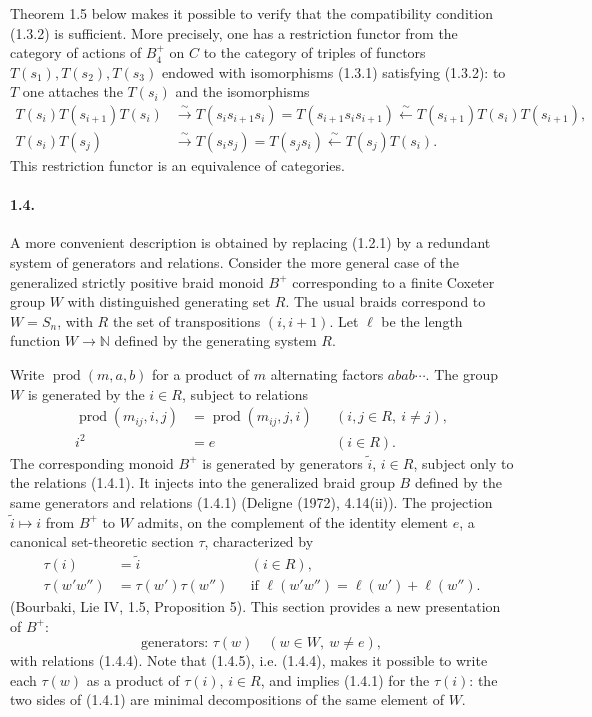 \documentclass[11pt]{article}
\newcommand{\prodword}{\operatorname{prod}}
\newcommand{\N}{\mathbb N}
\begin{document}
Theorem 1.5 below makes it possible to verify that the compatibility condition (1.3.2) is sufficient. More precisely, one has a restriction functor from the category of actions of $B_4^+$ on $C$ to the category of triples of functors $T(s_1),T(s_2),T(s_3)$ endowed with isomorphisms (1.3.1) satisfying (1.3.2): to $T$ one attaches the $T(s_i)$ and the isomorphisms
\[
\begin{aligned}
 T(s_i)T(s_{i+1})T(s_i)&\xrightarrow{\sim}T(s_i s_{i+1}s_i)=T(s_{i+1}s_i s_{i+1})\xleftarrow{\sim}T(s_{i+1})T(s_i)T(s_{i+1}),\\
 T(s_i)T(s_j)&\xrightarrow{\sim}T(s_i s_j)=T(s_js_i)\xleftarrow{\sim}T(s_j)T(s_i).
\end{aligned}
\]
This restriction functor is an equivalence of categories.

\paragraph{1.4.} A more convenient description is obtained by replacing (1.2.1) by a redundant system of generators and relations. Consider the more general case of the generalized strictly positive braid monoid $B^+$ corresponding to a finite Coxeter group $W$ with distinguished generating set $R$. The usual braids correspond to $W=S_n$, with $R$ the set of transpositions $(i,i+1)$. Let $\ell$ be the length function $W\to\N$ defined by the generating system $R$.

Write $\prodword(m,a,b)$ for a product of $m$ alternating factors $abab\cdots$. The group $W$ is generated by the $i\in R$, subject to relations
\begin{align}
 \prodword(m_{ij},i,j)&=\prodword(m_{ij},j,i) &&(i,j\in R,\ i\ne j),\tag{1.4.1}\\
 i^2&=e &&(i\in R).\tag{1.4.2}
\end{align}
The corresponding monoid $B^+$ is generated by generators $\widetilde{i}$, $i\in R$, subject only to the relations (1.4.1). It injects into the generalized braid group $B$ defined by the same generators and relations (1.4.1) (Deligne (1972), 4.14(ii)). The projection $\widetilde{i}\mapsto i$ from $B^+$ to $W$ admits, on the complement of the identity element $e$, a canonical set-theoretic section $\tau$, characterized by
\begin{align}
 \tau(i)&=\widetilde{i} &&(i\in R),\tag{1.4.3}\\
 \tau(w'w'')&=\tau(w')\tau(w'') &&\text{if }\ell(w'w'')=\ell(w')+\ell(w'').\tag{1.4.4}
\end{align}
(Bourbaki, Lie IV, 1.5, Proposition 5). This section provides a new presentation of $B^+$:
\begin{equation}
\text{generators: }\tau(w)\quad(w\in W,\ w\ne e),\tag{1.4.5}
\end{equation}
with relations (1.4.4). Note that (1.4.5), i.e. (1.4.4), makes it possible to write each $\tau(w)$ as a product of $\tau(i)$, $i\in R$, and implies (1.4.1) for the $\tau(i)$: the two sides of (1.4.1) are minimal decompositions of the same element of $W$.
\end{document}
